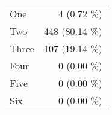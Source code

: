 \begin{tabular}{ l  r }
One & 4 (0.72 \%)\\
Two & 448 (80.14 \%)\\
Three & 107 (19.14 \%)\\
Four & 0 (0.00 \%)\\
Five & 0 (0.00 \%)\\
Six & 0 (0.00 \%)\\
\end{tabular}